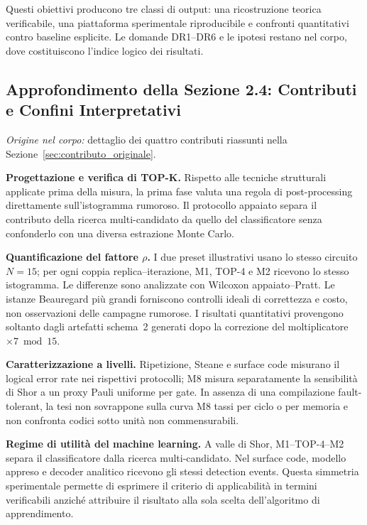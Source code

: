\begin{onehalfspace}
Questi obiettivi producono tre classi di output: una ricostruzione teorica verificabile, una piattaforma sperimentale riproducibile e confronti quantitativi contro baseline esplicite. Le domande DR1--DR6 e le ipotesi restano nel corpo, dove costituiscono l'indice logico dei risultati.

\subsection{Approfondimento della Sezione 2.4: Contributi e Confini Interpretativi}
\label{app:obiettivi:contributi}

\noindent\textit{Origine nel corpo:} dettaglio dei quattro contributi riassunti nella Sezione~\ref{sec:contributo_originale}.

\textbf{Progettazione e verifica di TOP-K.} Rispetto alle tecniche strutturali applicate prima della misura, la prima fase valuta una regola di post-processing direttamente sull'istogramma rumoroso. Il protocollo appaiato separa il contributo della ricerca multi-candidato da quello del classificatore senza confonderlo con una diversa estrazione Monte Carlo.

\textbf{Quantificazione del fattore $\rho$.} I due preset illustrativi usano lo stesso circuito $N=15$; per ogni coppia replica--iterazione, M1, TOP-4 e M2 ricevono lo stesso istogramma. Le differenze sono analizzate con Wilcoxon appaiato--Pratt. Le istanze Beauregard più grandi forniscono controlli ideali di correttezza e costo, non osservazioni delle campagne rumorose. I risultati quantitativi provengono soltanto dagli artefatti schema~2 generati dopo la correzione del moltiplicatore $\times7\bmod15$.

\textbf{Caratterizzazione a livelli.} Ripetizione, Steane e surface code misurano il logical error rate nei rispettivi protocolli; M8 misura separatamente la sensibilità di Shor a un proxy Pauli uniforme per gate. In assenza di una compilazione fault-tolerant, la tesi non sovrappone sulla curva M8 tassi per ciclo o per memoria e non confronta codici sotto unità non commensurabili.

\textbf{Regime di utilità del machine learning.} A valle di Shor, M1--TOP-4--M2 separa il classificatore dalla ricerca multi-candidato. Nel surface code, modello appreso e decoder analitico ricevono gli stessi detection events. Questa simmetria sperimentale permette di esprimere il criterio di applicabilità in termini verificabili anziché attribuire il risultato alla sola scelta dell'algoritmo di apprendimento.


\end{onehalfspace}
